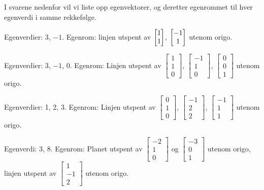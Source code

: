 \begin{losning}
I svarene nedenfor vil vi liste opp egenvektorer, og deretter egenrommet til hver egenverdi i samme rekkefølge.
\begin{punkt}
Egenverdier: 3, $-1$. Egenrom: linjen utspent av $\begin{bmatrix} 1 \\ 1 \end{bmatrix}$, $\begin{bmatrix} -1 \\ 1 \end{bmatrix}$ utenom origo.
\end{punkt}

\begin{punkt}
Egenverdier: 3, $-1$, 0. Egenrom: Linjen utspent av $\begin{bmatrix} 
1\\
1\\
0
\end{bmatrix}$, $\begin{bmatrix} 
-1\\
1\\
0
\end{bmatrix}$, $\begin{bmatrix} 
0\\
0\\
1
\end{bmatrix}$ utenom origo.

\end{punkt}

\begin{punkt}
Egenverdier: 1, 2, 3. Egenrom: Linjen utspent av $\begin{bmatrix} 
0\\
1\\
0
\end{bmatrix}$, $\begin{bmatrix} 
-1\\
2\\
2
\end{bmatrix}$, $\begin{bmatrix} 
-1\\
1\\
1
\end{bmatrix}$ utenom origo.
\end{punkt}

\begin{punkt}
Egenverdi: 3, 8. Egenrom: Planet utspent av $\begin{bmatrix} 
-2\\
1\\
0
\end{bmatrix}$ og $\begin{bmatrix} 
-3\\
0\\
1
\end{bmatrix}$ utenom origo, linjen utspent av $\begin{bmatrix} 
1\\
-1\\
2
\end{bmatrix}$ utenom origo.
\end{punkt}



\end{losning}




